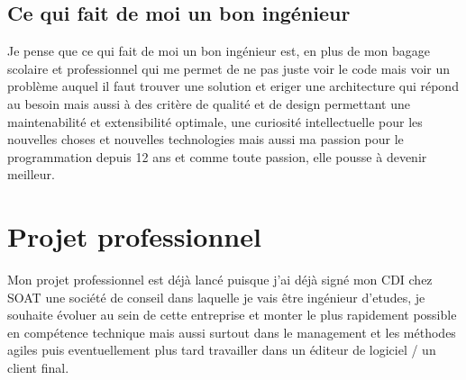 \subsection{Ce qui fait de moi un bon ingénieur}

Je pense que ce qui fait de moi un bon ingénieur est, en plus de mon bagage scolaire et professionnel qui me permet de
ne pas juste voir le code mais voir un problème auquel il faut trouver une solution et eriger une architecture 
qui répond au besoin mais aussi à des critère de qualité et de design permettant une maintenabilité et extensibilité 
optimale, 
une curiosité intellectuelle pour les nouvelles choses et nouvelles technologies
mais aussi ma passion pour le programmation depuis 12 ans et comme toute passion, elle pousse 
à devenir meilleur.

\section{Projet professionnel}
Mon projet professionnel est déjà lancé puisque j'ai déjà signé mon CDI chez SOAT une 
société de conseil dans laquelle je vais être ingénieur d'etudes, je souhaite évoluer 
au sein de cette entreprise et monter le plus rapidement possible en compétence technique 
mais aussi surtout dans le management et les méthodes agiles
puis eventuellement plus tard travailler dans un éditeur de logiciel / un client final.